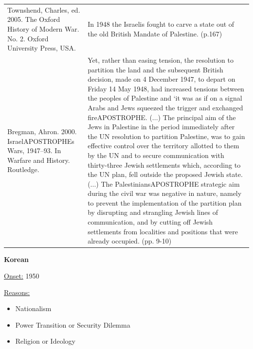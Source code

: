 {\begin{longtable}{p{}p{}}
\\
Townshend, Charles, ed. 2005. The Oxford History of Modern War. No. 2. Oxford University Press, USA. & In 1948 the Israelis fought to carve a state out of the old
British Mandate of Palestine. (p.167)
\\
Bregman, Ahron. 2000. IsraelAPOSTROPHEs Wars, 1947–93. In Warfare and History. Routledge. & Yet, rather than easing tension, the resolution to partition the land and the subsequent British decision, made on 4 December 1947, to depart on Friday 14 May 1948, had increased tensions between the peoples of Palestine and ‘it was as if on a signal Arabs and Jews squeezed the trigger and exchanged fireAPOSTROPHE. (...) The principal aim of the Jews in Palestine in the period immediately after the UN resolution to partition Palestine, was to gain effective control over the territory allotted to them by the UN and to secure communication with thirty-three Jewish settlements which, according to the UN plan, fell outside the proposed Jewish state. (...) The PalestiniansAPOSTROPHE strategic aim during the civil war was negative in nature, namely to prevent the implementation of the partition plan by disrupting and strangling Jewish lines of communication, and by cutting off Jewish settlements from localities and positions that were already occupied. (pp. 9-10)
\\
\end{longtable}}
\clearpage
         \textbf{Korean} 

          \underline{Onset:} 1950         

\underline{Reasons:}
\begin{itemize}
\item Nationalism
\item Power Transition or Security Dilemma
\item Religion or Ideology
\end{itemize}

